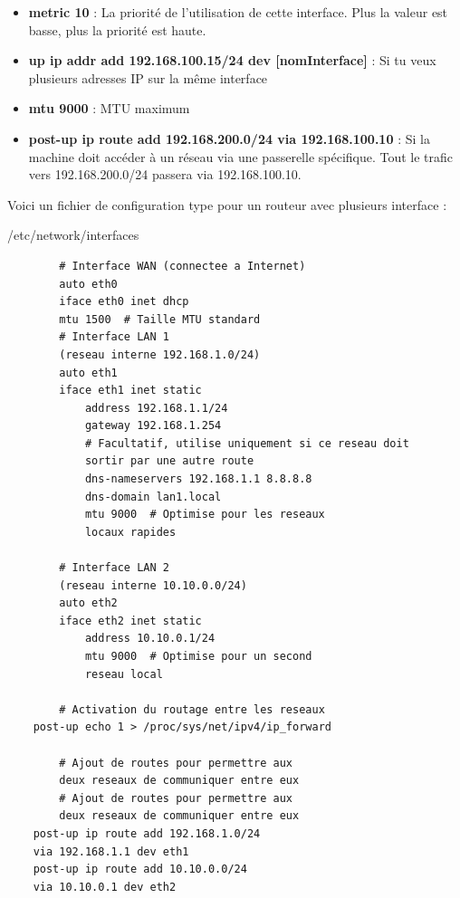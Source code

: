 \documentclass{article}
\begin{document}
\begin{itemize}
\begin{itemize}
        \item \textbf{metric 10} : La priorité de l'utilisation de cette interface. Plus la valeur est basse, plus la priorité est haute.
        \item \textbf{up ip addr add 192.168.100.15/24 dev [nomInterface]} : Si tu veux plusieurs adresses IP sur la même interface
        \item \textbf{mtu 9000} : MTU maximum
        \item \textbf{post-up ip route add 192.168.200.0/24 via 192.168.100.10} : Si la machine doit accéder à un réseau via une passerelle spécifique. Tout le trafic vers 192.168.200.0/24 passera via 192.168.100.10.
    \end{itemize}
\end{itemize}

Voici un fichier de configuration type pour un routeur avec plusieurs interface :

\begin{configbox}{/etc/network/interfaces}
    \begin{lstlisting}
        # Interface WAN (connectee a Internet)
        auto eth0
        iface eth0 inet dhcp
        mtu 1500  # Taille MTU standard
        # Interface LAN 1 
        (reseau interne 192.168.1.0/24)
        auto eth1
        iface eth1 inet static
            address 192.168.1.1/24
            gateway 192.168.1.254  
            # Facultatif, utilise uniquement si ce reseau doit 
            sortir par une autre route
            dns-nameservers 192.168.1.1 8.8.8.8
            dns-domain lan1.local
            mtu 9000  # Optimise pour les reseaux 
            locaux rapides

        # Interface LAN 2 
        (reseau interne 10.10.0.0/24)
        auto eth2
        iface eth2 inet static
            address 10.10.0.1/24
            mtu 9000  # Optimise pour un second 
            reseau local

        # Activation du routage entre les reseaux
    post-up echo 1 > /proc/sys/net/ipv4/ip_forward

        # Ajout de routes pour permettre aux 
        deux reseaux de communiquer entre eux
        # Ajout de routes pour permettre aux 
        deux reseaux de communiquer entre eux
    post-up ip route add 192.168.1.0/24 
    via 192.168.1.1 dev eth1
    post-up ip route add 10.10.0.0/24 
    via 10.10.0.1 dev eth2
    \end{lstlisting}
\end{configbox}
\end{document}
